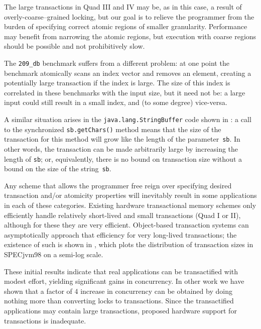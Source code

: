 The large transactions in Quad III and IV may be, as in this case, a result of
overly-coarse--grained locking, but our goal is to
relieve the programmer from the burden of specifying correct
atomic regions of smaller granularity.  Performance may benefit from
narrowing the atomic regions, but execution with coarse regions should
be possible and not prohibitively slow.

The \texttt{209\_db} benchmark suffers from a different problem: at one
point the benchmark atomically scans an index vector and removes an
element, creating a potentially large transaction if the index is
large.  The size of this index is correlated in these benchmarks with
the input size, but it need not be: a large input could still result
in a small index, and (to some degree) vice-versa.

A similar situation arises in the {\tt java.lang.StringBuffer} code
shown in :  a call to the synchronized
\texttt{sb.getChars()} method means that
the size of the transaction for this method will grow like the length
of the parameter~\texttt{sb}.  In other words, the transaction can be
made arbitrarily large by increasing the length of \texttt{sb}; or,
equivalently, there is no bound on transaction size without a bound on
the size of the string~\texttt{sb}.


Any scheme that allows the programmer free reign over specifying
desired transaction and/or atomicity properties will inevitably result
in some applications in each of these categories.  Existing
hardware transactional memory schemes only efficiently handle
relatively short-lived and small transactions (Quad I or II),
although for these they are very efficient.  Object-based
transaction systems can asymptotically approach that efficiency for
very long-lived transactions;  the existence of such is shown in
, which plots
the distribution of transaction sizes in SPECjvm98
on a semi-log scale.


\vspace*{5mm}

These initial results indicate that real applications can be
transactified with modest effort, yielding significant gains in
concurrency.  In other work \cite{AnanianAsKuLeLi05} we have shown
that a factor of 4 increase in concurrency can be obtained
by doing nothing more than converting locks to transactions.  Since
the transactified applications may contain large transactions,
proposed hardware support for transactions is inadequate.


